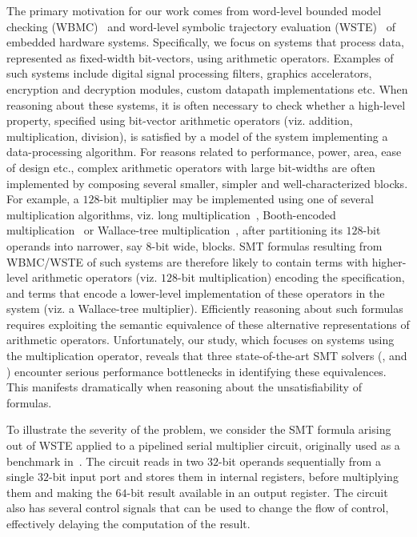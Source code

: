 The primary motivation for our work comes from word-level bounded
model checking (WBMC)~\cite{cbmc,hwcbmc} and word-level symbolic
trajectory evaluation (WSTE)~\cite{wste} of embedded hardware systems.
Specifically, we focus on systems that process data, represented as
fixed-width bit-vectors, using arithmetic operators.  Examples of such
systems include digital signal processing filters, graphics
accelerators, encryption and decryption modules, custom datapath
implementations etc.  When reasoning about these systems, it is often
necessary to check whether a high-level property, specified using
bit-vector arithmetic operators (viz. addition, multiplication,
division), is satisfied by a model of the system implementing a
data-processing algorithm.  For reasons related to performance, power,
area, ease of design etc., complex arithmetic operators with large
bit-widths are often implemented by composing several smaller, simpler
and well-characterized blocks.  For example, a $128$-bit multiplier
may be implemented using one of several multiplication algorithms,
viz. long multiplication~\cite{long}, Booth-encoded
multiplication~\cite{booth} or Wallace-tree
multiplication~\cite{wallace}, after partitioning its $128$-bit
operands into narrower, say $8$-bit wide, blocks.  SMT formulas
resulting from WBMC/WSTE of such systems are therefore likely to
contain terms with higher-level arithmetic operators (viz. $128$-bit
multiplication) encoding the specification, and terms that encode a
lower-level implementation of these operators in the system (viz. a
Wallace-tree multiplier).  Efficiently reasoning about such formulas
requires exploiting the semantic equivalence of these alternative
representations of arithmetic operators.  Unfortunately, our study,
which focuses on systems using the multiplication operator, reveals
that three state-of-the-art SMT solvers ({\zthree}, {\cvcfour} and
{\boolector}) encounter serious performance bottlenecks in identifying
these equivalences.  This manifests dramatically when reasoning about
the unsatisfiability of formulas.

 To illustrate
the severity of the problem, we consider the SMT formula arising out
of WSTE applied to a pipelined serial multiplier circuit, originally
used as a benchmark in~\cite{wste}.  The circuit reads in two $32$-bit
operands sequentially from a single $32$-bit input port and stores
them in internal registers, before multiplying them and making the
$64$-bit result available in an output register.  The circuit also has
several control signals that can be used to change the flow of
control, effectively delaying the computation of the result.

